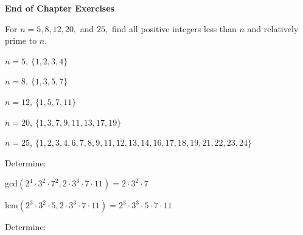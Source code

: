 \documentclass[11pt,largemargins]{homework}
\begin{document}
\maketitle


\textbf{\large{End of Chapter Exercises}}

\question
For $n=5,8,12,20,$ and $25,$ find all positive integers less than $n$ and relatively prime to $n$.

\begin{alphaparts}
    \questionpart $n=5$,
    $\{1,2,3,4\}$

    \questionpart $n=8$,
    $\{1,3,5,7\}$

    \questionpart $n=12$,
    $\{1,5,7,11\}$

    \questionpart $n=20$,
    $\{1,3,7,9,11,13,17,19\}$

    \questionpart $n=25$,
    $\{1,2,3,4,6,7,8,9,11,12,13,14,16,17,18,19,21,22,23,24\}$

\end{alphaparts}

\question 
Determine: 

\begin{alphaparts}
    \questionpart
    gcd$(2^4 \cdot 3^2 \cdot 7^2, 2 \cdot 3^3 \cdot 7 \cdot 11) = 2 \cdot 3^2 \cdot 7$

    \questionpart
    lcm$(2^3 \cdot 3^2 \cdot 5, 2 \cdot 3^3 \cdot 7 \cdot 11) = 2^3 \cdot 3^3 \cdot 5 \cdot 7 \cdot 11$

\end{alphaparts}

\question 
Determine:
\end{document}

